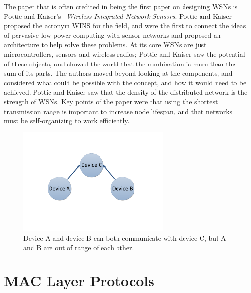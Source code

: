 The paper that is often credited in being the first paper on designing WSNs is 
Pottie and Kaiser's~\cite{WINSProject}  \emph{Wireless Integrated Network Sensors}.
Pottie and Kaiser proposed the acronym WINS for the field, and were the first
to connect the ideas of pervasive low power computing with sensor networks and proposed an
architecture to help solve these problems. 
At its core WSNs are just microcontrollers, sensors and 
wireless radios; Pottie and Kaiser saw the potential of these
objects, and showed the world that the combination is more than the sum of its parts. 
The authors moved beyond looking at the components, and considered what could be possible
with the concept, and how it would need to be achieved. Pottie and Kaiser 
saw that the density of the distributed network is the strength of WSNs. Key points of the 
paper were that using the shortest transmission range is important
to increase node lifespan, and that networks must be self-organizing to work efficiently.

\begin{figure}[tb]
	\centering
		\includegraphics[width=3in]{images/relatedWork/HiddenNode.pdf}
	\caption{Device A and device B can both communicate with device C, but A and B are out of range of each other.}
	\label{fig:images_relatedWork_hiddenNodeProblem}
\end{figure}


\section{MAC Layer Protocols}


